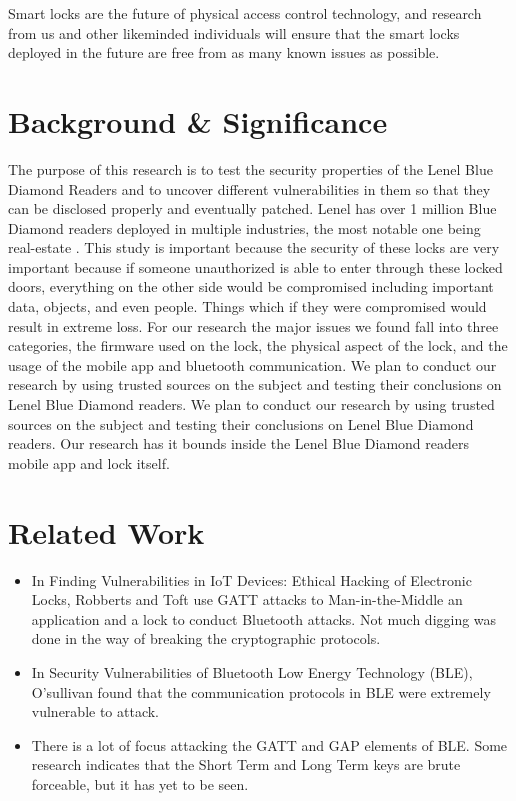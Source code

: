 \documentclass[10pt,twocolumn,letterpaper]{article}
\begin{document}
Smart locks are the future of physical access control technology, and research from us and other likeminded individuals will ensure that the smart locks deployed in the future are free from as many known issues as possible.

\section{Background \& Significance}
The purpose of this research is to test the security properties of the Lenel Blue Diamond Readers and to uncover different vulnerabilities in them so that they can be disclosed properly and eventually patched. Lenel has over 1 million Blue Diamond readers deployed in multiple industries, the most notable one being real-estate \cite{lenelbluediamondwebsite}. This study is important because the security of these locks are very important because if someone unauthorized is able to enter through these locked doors, everything on the other side would be compromised including important data, objects, and even people. Things which if they were compromised would result in extreme loss. For our research the major issues we found fall into three categories, the firmware used on the lock, the physical aspect of the lock, and the usage of the mobile app and bluetooth communication. We plan to conduct our research by using trusted sources on the subject and testing their conclusions on Lenel Blue Diamond readers. We plan to conduct our research by using trusted sources on the subject and testing their conclusions on Lenel Blue Diamond readers. Our research has it bounds inside the Lenel Blue Diamond readers mobile app and lock itself.

\section{Related Work}

\begin{itemize}
    \item In Finding Vulnerabilities in IoT Devices: Ethical Hacking of Electronic Locks, Robberts and Toft use GATT attacks to Man-in-the-Middle an application and a lock to conduct Bluetooth attacks. Not much digging was done in the way of breaking the cryptographic protocols. 
    \item In Security Vulnerabilities of Bluetooth Low Energy Technology (BLE), O'sullivan found that the communication protocols in BLE were extremely vulnerable to attack.
    \item There is a lot of focus attacking the GATT and GAP elements of BLE. Some research indicates that the Short Term and Long Term keys are brute forceable, but it has yet to be seen. 
\end{itemize}
\end{document}
